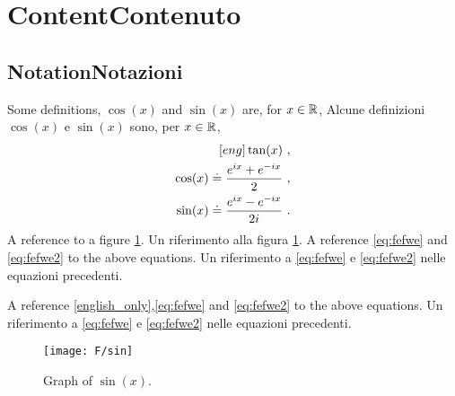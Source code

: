 \section{\ifCDLeng Content\fi \ifCDLita Contenuto\fi}

\subsection{\ifCDLeng Notation\fi \ifCDLita Notazioni\fi}

\begin{Defn}
  \label{defn:1}
  \CDLeng Some definitions, $\cos(x)$ and \(\sin(x)\) are,
  \CDLeng for \(x\in{\mathbb{R}}\),
  \CDLita Alcune definizioni $\cos(x)$ e \(\sin(x)\) sono,
  \CDLita per \(x\in{\mathbb{R}}\),
  \begin{eqnarray}
    [eng] \tan(x)~, \label{english_only}\\
    \cos(x) \doteq \frac{e^{ix}+e^{-ix}}{2}~,  \label{eq:fefwe} \\
    \sin(x) \doteq \frac{e^{ix}-e^{-ix}}{2i}~. \label{eq:fefwe2}
  \end{eqnarray}
  \CDLeng A reference to a figure \ref{fig:a354}.
  \CDLita Un riferimento alla figura   \ref{fig:a354}.
  \CDLeng A reference \eqref{eq:fefwe} and  \eqref{eq:fefwe2} to the above equations.
  \CDLita Un riferimento a \eqref{eq:fefwe} e  \eqref{eq:fefwe2} nelle equazioni precedenti.
\end{Defn}

\CDLeng A reference \eqref{english_only},\eqref{eq:fefwe} and  \eqref{eq:fefwe2} to the above equations.
\CDLita Un riferimento a \eqref{eq:fefwe} e  \eqref{eq:fefwe2} nelle equazioni precedenti.


\begin{figure}[ht]\label{fig:a354}
  \begin{center}
    \texttt{[image: F/sin]}
    \caption{Graph of \(\sin(x)\).}
  \end{center}
\end{figure}




